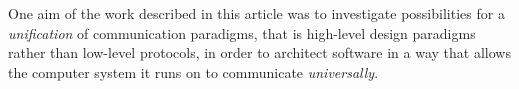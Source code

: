 One aim of the work described in this article was to investigate possibilities
for a \emph{unification} of communication paradigms, that is high-level design
paradigms rather than low-level protocols, in order to architect software in a
way that allows the computer system it runs on to communicate \emph{universally}.
